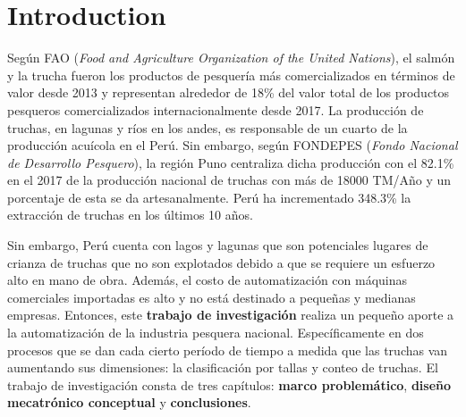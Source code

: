 
\newpage
\clearpage{\pagestyle{empty}\cleardoublepage}
\pagestyle{after-table-of-content}
\chapter*{\centering \large Introduction} 

Según FAO (\textit{Food and Agriculture Organization of the United Nations}), el salmón y la trucha fueron los productos de pesquería más comercializados en términos de valor desde 2013 y representan alrededor de 18\% del valor total de los productos pesqueros comercializados internacionalmente desde 2017. \cite{FAO2017} La producción de truchas, en lagunas y ríos en los andes, es responsable de un cuarto de la producción acuícola en el Perú.\cite{SeafoodTradeIntelligencePortal2018} Sin embargo, según FONDEPES (\textit{Fondo Nacional de Desarrollo Pesquero}), la región Puno centraliza dicha producción con el 82.1\% en el 2017 de la producción nacional de truchas con más de 18000 TM/Año y un porcentaje de esta se da artesanalmente.\cite{FONDEPES2014} Perú ha incrementado 348.3\% la extracción de truchas en los últimos 10 años.\cite{MinisteriodelaProducciondelPeru2018}

Sin embargo, Perú cuenta con lagos y lagunas que son potenciales lugares de crianza de truchas que no son explotados debido a que se requiere un esfuerzo alto en mano de obra. Además, el costo de automatización con máquinas comerciales importadas es alto y no está destinado a pequeñas y medianas empresas. Entonces, este \textbf{trabajo de investigación} realiza un pequeño aporte a la automatización de la industria pesquera nacional. Específicamente en dos procesos que se dan cada cierto período de tiempo a medida que las truchas van aumentando sus dimensiones: la clasificación por tallas y conteo de truchas. El trabajo de investigación consta de tres capítulos: \textbf{marco problemático}, \textbf{diseño mecatrónico conceptual} y \textbf{conclusiones}.

